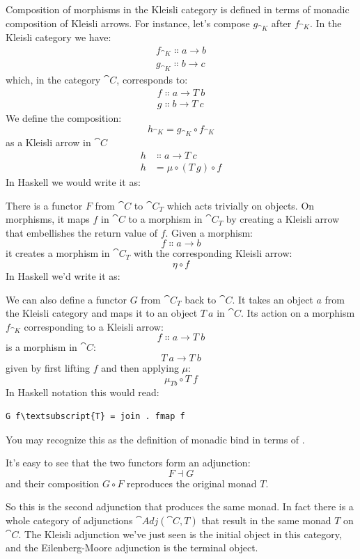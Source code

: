 Composition of morphisms in the Kleisli category is defined in terms of
monadic composition of Kleisli arrows. For instance, let's compose
$g_{\cat{K}}$ after $f_{\cat{K}}$. In the Kleisli category we have:
\begin{gather*}
f_{\cat{K}} \Colon a \to b \\
g_{\cat{K}} \Colon b \to c
\end{gather*}
which, in the category $\cat{C}$, corresponds to:
\begin{gather*}
f \Colon a \to T\ b \\
g \Colon b \to T\ c
\end{gather*}
We define the composition:
\[h_{\cat{K}} = g_{\cat{K}} \circ f_{\cat{K}}\]
as a Kleisli arrow in $\cat{C}$
\begin{align*}
h &\Colon a \to T\ c \\
h &= \mu \circ (T\ g) \circ f
\end{align*}
In Haskell we would write it as:

There is a functor $F$ from $\cat{C}$ to $\cat{C}_T$
which acts trivially on objects. On morphisms, it maps $f$ in
$\cat{C}$ to a morphism in $\cat{C}_T$ by creating a
Kleisli arrow that embellishes the return value of $f$. Given a
morphism:
\[f \Colon a \to b\]
it creates a morphism in $\cat{C}_T$ with the
corresponding Kleisli arrow:
\[\eta \circ f\]
In Haskell we'd write it as:

We can also define a functor $G$ from $\cat{C}_T$
back to $\cat{C}$. It takes an object $a$ from the Kleisli
category and maps it to an object $T\ a$ in $\cat{C}$. Its action 
on a morphism $f_{\cat{K}}$ corresponding to a Kleisli arrow:
\[f \Colon a \to T\ b\]
is a morphism in $\cat{C}$:
\[T\ a \to T\ b\]
given by first lifting $f$ and then applying $\mu$:
\[\mu_{T b} \circ T\ f\]
In Haskell notation this would read:

\begin{Verbatim}[commandchars=\\\{\}]
G f\textsubscript{T} = join . fmap f
\end{Verbatim}
You may recognize this as the definition of monadic bind in terms of
.

It's easy to see that the two functors form an adjunction:
\[F \dashv G\]
and their composition $G \circ F$ reproduces the original monad $T$.

So this is the second adjunction that produces the same monad. In fact
there is a whole category of adjunctions $\cat{Adj}(\cat{C}, T)$ that result
in the same monad $T$ on $\cat{C}$. The Kleisli adjunction we've
just seen is the initial object in this category, and the
Eilenberg-Moore adjunction is the terminal object.


